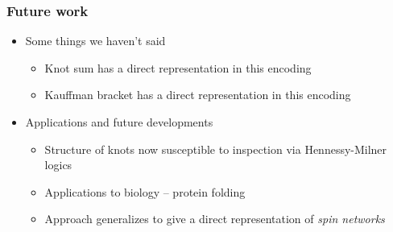 \documentclass{beamer}
\begin{document}
\begin{frame}
  \frametitle<presentation>{Future work}

  
  \begin{itemize}
  \item
    Some things we haven't said
    \begin{itemize}
    \item
      Knot sum has a direct representation in this encoding
    \item
      Kauffman bracket has a direct representation in this encoding
    \end{itemize}
    \item Applications and future developments
      \begin{itemize}
      \item Structure of knots now susceptible to inspection via
        Hennessy-Milner logics
      \item Applications to biology -- protein folding
      \item Approach generalizes to give a direct representation of \textit{spin networks}
      \end{itemize}
  \end{itemize}
\end{frame}

\end{document}
